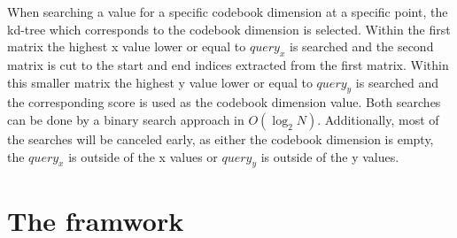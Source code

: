When searching a value for a specific codebook dimension at a specific point, the kd-tree which corresponds to the codebook dimension is selected. Within the first matrix the highest x value lower or equal to $query_x$ is searched and the second matrix is cut to the start and end indices extracted from the first matrix. Within this smaller matrix the highest y value lower or equal to $query_y$ is searched and the corresponding score is used as the codebook dimension value. Both searches can be done by a binary search approach in $O(\log_2 N)$. Additionally, most of the searches will be canceled early, as either the codebook dimension is empty, the $query_x$ is outside of the x values or $query_y$ is outside of the y values. %

%
%


\section{The framwork}
